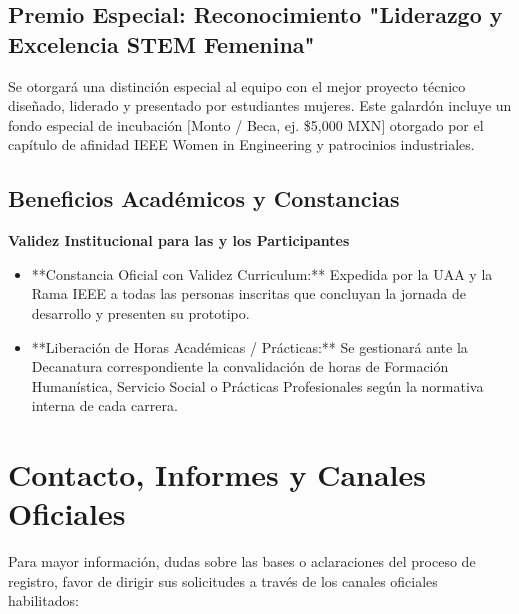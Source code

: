 \documentclass[11pt,letterpaper]{article}
\newcommand{\oktitle}[1]{\textbf{\color{greenok}#1}\\[3pt]}
\begin{document}
\subsection{Premio Especial: Reconocimiento "Liderazgo y Excelencia STEM Femenina"}
\begin{stembox}
Se otorgará una distinción especial al equipo con el mejor proyecto técnico diseñado, liderado y presentado por estudiantes mujeres. Este galardón incluye un fondo especial de incubación $[$Monto / Beca, ej. \$5,000 MXN$]$ otorgado por el capítulo de afinidad IEEE Women in Engineering y patrocinios industriales.
\end{stembox}

\subsection{Beneficios Académicos y Constancias}
\begin{okbox}
\oktitle{Validez Institucional para las y los Participantes}
\begin{itemize}
    \item **Constancia Oficial con Validez Curriculum:** Expedida por la UAA y la Rama IEEE a todas las personas inscritas que concluyan la jornada de desarrollo y presenten su prototipo.
    \item **Liberación de Horas Académicas / Prácticas:** Se gestionará ante la Decanatura correspondiente la convalidación de horas de Formación Humanística, Servicio Social o Prácticas Profesionales según la normativa interna de cada carrera.
\end{itemize}
\end{okbox}

\section{Contacto, Informes y Canales Oficiales}

Para mayor información, dudas sobre las bases o aclaraciones del proceso de registro, favor de dirigir sus solicitudes a través de los canales oficiales habilitados:
\end{document}

